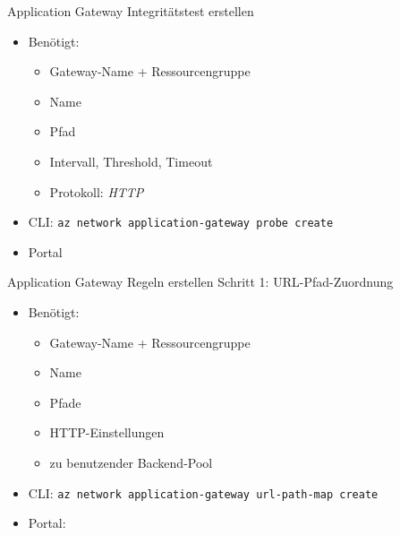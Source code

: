 \begin{flashcard}[Definition]{Application Gateway Integritätstest erstellen}
    \begin{itemize}
        \item Benötigt:
            \begin{itemize}
                \item Gateway-Name + Ressourcengruppe
                \item Name
                \item Pfad
                \item Intervall, Threshold, Timeout
                \item Protokoll: \emph{HTTP}
            \end{itemize}
        \item CLI: \texttt{az network application-gateway probe create}
        \item Portal
    \end{itemize}
\end{flashcard}

\begin{flashcard}[Definition]{Application Gateway Regeln erstellen}
    Schritt 1: URL-Pfad-Zuordnung
    \begin{itemize}
        \item Benötigt:
            \begin{itemize}
                \item Gateway-Name + Ressourcengruppe
                \item Name
                \item Pfade
                \item HTTP-Einstellungen
                \item zu benutzender Backend-Pool
            \end{itemize}
        \item CLI: \texttt{az network application-gateway url-path-map create}
        \item Portal:
    \end{itemize}
\end{flashcard}

